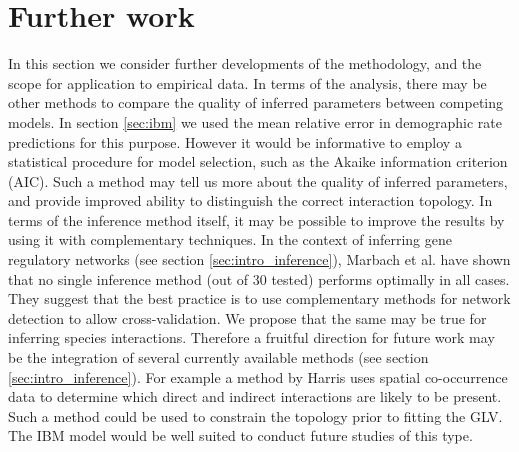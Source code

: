 



\section{Further work}
\label{sec:si_conc}

In this section we consider further developments of the methodology, and the scope for application to empirical data. In terms of the analysis, there may be other methods to compare the quality of inferred parameters between competing models. In section \ref{sec:ibm} we used the mean relative error in demographic rate predictions for this purpose. However it would be informative to employ a statistical procedure for model selection, such as the Akaike information criterion (AIC). Such a method may tell us more about the quality of inferred parameters, and provide improved ability to distinguish the correct interaction topology. In terms of the inference method itself, it may be possible to improve the results by using it with complementary techniques. In the context of inferring gene regulatory networks (see section \ref{sec:intro_inference}), Marbach et al. \cite{marbach2012wisdom} have shown that no single inference method (out of 30 tested) performs optimally in all cases. They suggest that the best practice is to use complementary methods for network detection to allow cross-validation. We propose that the same may be true for inferring species interactions. Therefore a fruitful direction for future work may be the integration of several currently available methods (see section \ref{sec:intro_inference}). For example a method by Harris \cite{Harris018861} uses spatial co-occurrence data to determine which direct and indirect interactions are likely to be present. Such a method could be used to constrain the topology prior to fitting the GLV. The IBM model would be well suited to conduct future studies of this type.


